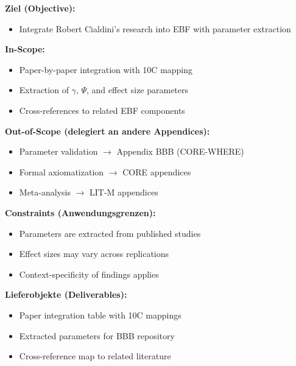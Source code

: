 
\begin{tcolorbox}[
    colback=orange!5!white,
    colframe=orange!75!black,
    title={\textbf{Appendix Scope: Ziel / In-Scope / Out-of-Scope / Constraints}},
    fonttitle=\bfseries
]

\textbf{Ziel (Objective):}
\begin{itemize}[nosep]
    \item Integrate Robert Cialdini's research into EBF with parameter extraction
\end{itemize}

\textbf{In-Scope:}
\begin{itemize}[nosep]
    \item Paper-by-paper integration with 10C mapping
    \item Extraction of $\gamma$, $\Psi$, and effect size parameters
    \item Cross-references to related EBF components
\end{itemize}

\textbf{Out-of-Scope (delegiert an andere Appendices):}
\begin{itemize}[nosep]
    \item Parameter validation $\rightarrow$ Appendix BBB (CORE-WHERE)
    \item Formal axiomatization $\rightarrow$ CORE appendices
    \item Meta-analysis $\rightarrow$ LIT-M appendices
\end{itemize}

\textbf{Constraints (Anwendungsgrenzen):}
\begin{itemize}[nosep]
    \item Parameters are extracted from published studies
    \item Effect sizes may vary across replications
    \item Context-specificity of findings applies
\end{itemize}

\textbf{Lieferobjekte (Deliverables):}
\begin{itemize}[nosep]
    \item Paper integration table with 10C mappings
    \item Extracted parameters for BBB repository
    \item Cross-reference map to related literature
\end{itemize}

\end{tcolorbox}

